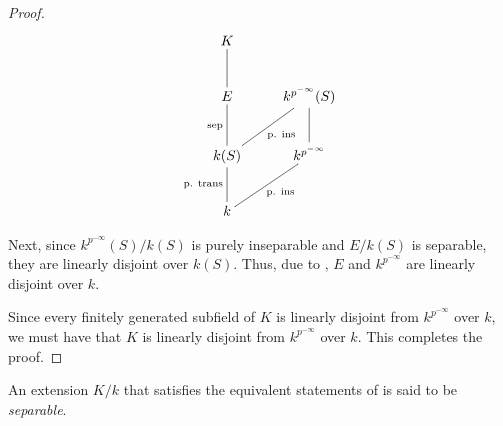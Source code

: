 \begin{proof}
    \begin{equation*}
    \xymatrix {
        K\ar@{-}[d] & \\
        E\ar@{-}[d]_{\text{sep}} & k^{p^{-\infty}}(S)\ar@{-}[d]\\
        k(S)\ar@{-}[d]_{\text{p. trans}}\ar@{-}[ru]_{\text{p. ins}} & k^{p^{-\infty}}\\
        k\ar@{-}[ru]_{\text{p. ins}}
    }
    \end{equation*}

    Next, since $k^{p^{-\infty}}(S)/k(S)$ is purely inseparable and $E/k(S)$ is separable, they are linearly disjoint over $k(S)$. Thus, due to , $E$ and $k^{p^{-\infty}}$ are linearly disjoint over $k$. 

    Since every finitely generated subfield of $K$ is linearly disjoint from $k^{p^{-\infty}}$ over $k$, we must have that $K$ is linearly disjoint from $k^{p^{-\infty}}$ over $k$. This completes the proof.

\end{proof}

\begin{definition}[Separable]
    An extension $K/k$ that satisfies the equivalent statements of  is said to be \emph{separable}.
\end{definition}

